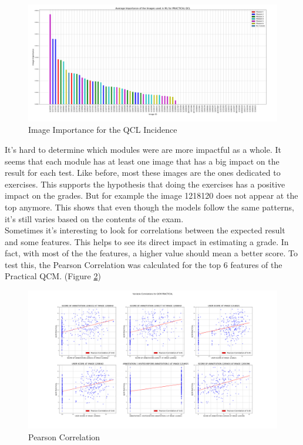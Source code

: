 \documentclass[a4paper,11pt]{report}
\numberwithin{figure}{section} %
\begin{document}
      \begin{figure}[H]
      \centering
      \includegraphics[width=.95\linewidth]{plots/im_importance_PRACTICAL_QCL_2018-04-29_14_33_48.png}
      \caption{Image Importance for the QCL Incidence}
      \label{fig:im_tp4}
      \end{figure}

	It's hard to determine which modules were are more impactful as a whole.
    It seems that each module has at least one image that has a big impact on the result for each test.
	Like before, most these images are the ones dedicated to exercises.
	This supports the hypothesis that doing the exercises has a positive impact on the grades.
	But for example the image 1218120 does not appear at the top anymore.
	This shows that even though the models follow the same patterns, it's still varies based on the contents of the exam.\\
    
    Sometimes it's interesting  to look for correlations between the expected result and some features.
    This helps to see its direct impact in estimating a grade.
    In fact, with most of the the features, a higher value should mean a better score.
    To test this, the Pearson Correlation was calculated for the top 6 features of the Practical QCM. (Figure \ref{fig:corr_tp})
      \begin{figure}[H]
      \centering
      \includegraphics[width=.95\linewidth]{plots/var_correlation_QCM_PRACTICAL_2018-04-29_14_38_14.png}
      \caption{Pearson Correlation}
      \label{fig:corr_tp}
      \end{figure}
    
\end{document}
